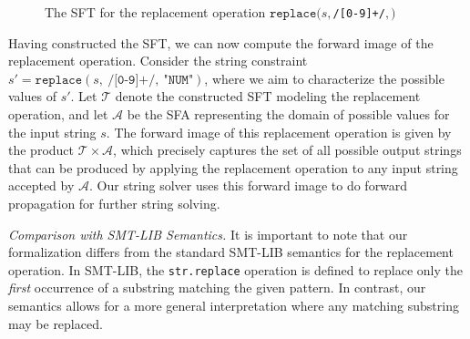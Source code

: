 \documentclass[a4paper,UKenglish,cleveref, autoref, anonymous, thm-restate]{lipics-v2021}
\begin{document}
\begin{figure}[h] \centering
  \caption{The SFT for the replacement operation $\texttt{replace}(s, $\texttt{/[0-9]+/}$, $$)$}
  \label{fig-rearranged-automata}
  \end{figure}


  Having constructed the SFT, we can now compute the forward image of the replacement operation. Consider the string constraint $s' = \texttt{replace}(s,~\texttt{/[0-9]+/},~\text{"}\texttt{NUM}\text{"})$, where we aim to characterize the possible values of $s'$. Let $\mathcal{T}$ denote the constructed SFT modeling the replacement operation, and let $\mathcal{A}$ be the SFA representing the domain of possible values for the input string $s$. The forward image of this replacement operation is given by the product $\mathcal{T} \times \mathcal{A}$, which precisely captures the set of all possible output strings that can be produced by applying the replacement operation to any input string accepted by $\mathcal{A}$.
  Our string solver uses this forward image to do forward propagation for further string solving.

  \emph{Comparison with SMT-LIB Semantics.} It is important to note that our formalization differs from the standard SMT-LIB semantics for the replacement operation. In SMT-LIB, the \texttt{str.replace} operation is defined to replace only the \emph{first} occurrence of a substring matching the given pattern. In contrast, our semantics allows for a more general interpretation where any matching substring may be replaced. 
\end{document}
